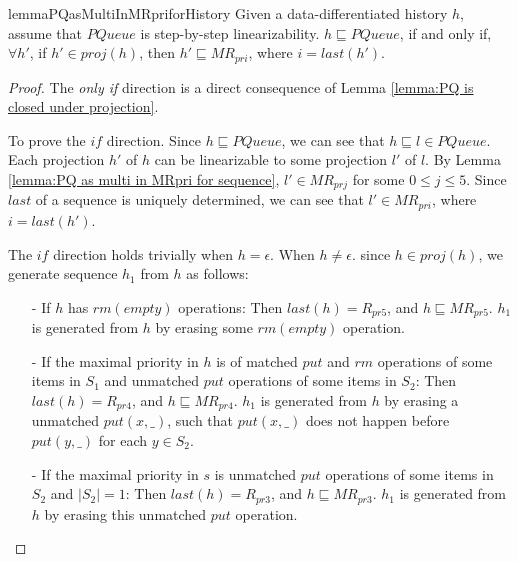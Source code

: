 \documentclass{llncs}
\begin{document}
\begin{restatable}{lemma}{PQasMultiInMRpriforHistory}
\label{lemma:PQ as multi in MRpri for history}
Given a data-differentiated history $h$, assume that $\textit{PQueue}$ is step-by-step linearizability. $h \sqsubseteq \textit{PQueue}$, if and only if, $\forall h'$, if $h' \in \textit{proj}(h)$, then $h' \sqsubseteq \textit{MR}_{\textit{pri}}$, where $i = \textit{last}(h')$.
\end{restatable}

\begin {proof}

The \textit{only if} direction is a direct consequence of Lemma \ref{lemma:PQ is closed under projection}.

To prove the $\textit{if}$ direction. Since $h \sqsubseteq \textit{PQueue}$, we can see that $h \sqsubseteq l \in \textit{PQueue}$. Each projection $h'$ of $h$ can be linearizable to some projection $l'$ of $l$. By Lemma \ref{lemma:PQ as multi in MRpri for sequence}, $l' \in \textit{MR}_{\textit{prj}}$ for some $0 \leq j \leq 5$. Since $\textit{last}$ of a sequence is uniquely determined, we can see that $l' \in \textit{MR}_{\textit{pri}}$, where $i = \textit{last}(h')$.


The $\textit{if}$ direction holds trivially when $h = \epsilon$. When $h \neq \epsilon$. since $h \in \textit{proj}(h)$, we generate sequence $h_1$ from $h$ as follows:

\begin{itemize}
\setlength{\itemsep}{0.5pt}
\item[-] If $h$ has $\textit{rm}(\textit{empty})$ operations: Then $\textit{last}(h) = R_{\textit{pr5}}$, and $h \sqsubseteq \textit{MR}_{\textit{pr5}}$. $h_1$ is generated from $h$ by erasing some $\textit{rm}(\textit{empty})$ operation.

\item[-] If the maximal priority in $h$ is of matched $\textit{put}$ and $\textit{rm}$ operations of some items in $S_1$ and unmatched $\textit{put}$ operations of some items in $S_2$: Then $\textit{last}(h) = R_{\textit{pr4}}$, and $h \sqsubseteq \textit{MR}_{\textit{pr4}}$. $h_1$ is generated from $h$ by erasing a unmatched $\textit{put}(x,\_)$, such that $\textit{put}(x,\_)$ does not happen before $\textit{put}(y,\_)$ for each $y \in S_2$.

\item[-] If the maximal priority in $s$ is unmatched $\textit{put}$ operations of some items in $S_2$ and $\vert S_2 \vert =1$: Then $\textit{last}(h) = R_{\textit{pr3}}$, and $h \sqsubseteq \textit{MR}_{\textit{pr3}}$. $h_1$ is generated from $h$ by erasing this unmatched $\textit{put}$ operation.


\end{itemize}
\end{proof}
\end{document}
